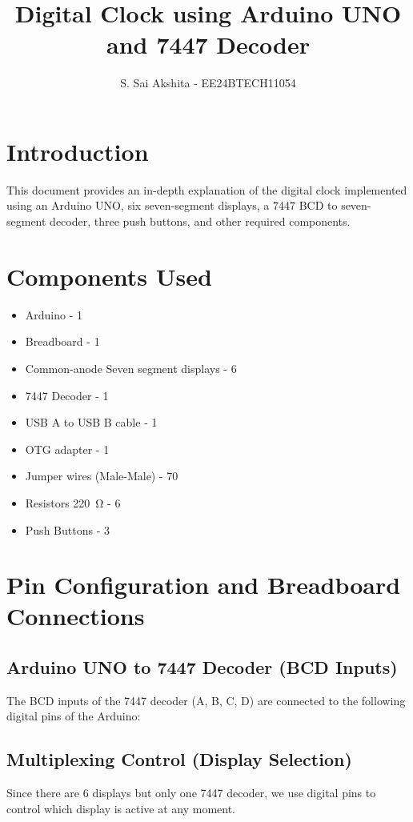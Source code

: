 \documentclass[a4paper,12pt]{article}
\title{Digital Clock using Arduino UNO and 7447 Decoder}
\author{S. Sai Akshita - EE24BTECH11054}
\theoremstyle{remark}
\begin{document}
\maketitle

\renewcommand{\thefigure}{\theenumi}
\renewcommand{\thetable}{\theenumi}



\section{Introduction}
This document provides an in-depth explanation of the digital clock implemented using an Arduino UNO, six seven-segment displays, a 7447 BCD to seven-segment decoder, three push buttons, and other required components.

\section{Components Used}

\begin{itemize}
    \item Arduino - 1  
    \item Breadboard - 1  
    \item Common-anode Seven segment displays - 6  
    \item 7447 Decoder - 1
    \item USB A to USB B cable - 1  
    \item OTG adapter - 1  
    \item Jumper wires (Male-Male) - 70  
    \item Resistors \SI{220}{\ohm} - 6    
    \item Push Buttons - 3  
\end{itemize}

\section{Pin Configuration and Breadboard Connections}

\subsection{Arduino UNO to 7447 Decoder (BCD Inputs)}
The BCD inputs of the 7447 decoder (A, B, C, D) are connected to the following digital pins of the Arduino:




\subsection{Multiplexing Control (Display Selection)}
Since there are 6 displays but only one 7447 decoder, we use digital pins to control which display is active at any moment.

\end{document}
